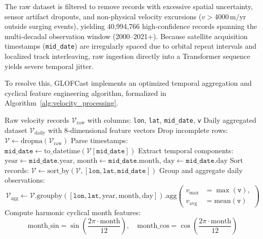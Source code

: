 \documentclass{mnnit}
\begin{document}
The raw dataset is filtered to remove records with excessive spatial uncertainty, sensor artifact dropouts, and non-physical velocity excursions ($v > 4000\,\text{m/yr}$ outside surging events), yielding 40,994,766 high-confidence records spanning the multi-decadal observation window (2000--2021+). Because satellite acquisition timestamps (\texttt{mid\_date}) are irregularly spaced due to orbital repeat intervals and localized track interleaving, raw ingestion directly into a Transformer sequence yields severe temporal jitter.

To resolve this, GLOFCast implements an optimized temporal aggregation and cyclical feature engineering algorithm, formalized in Algorithm~\ref{alg:velocity_processing}.

\begin{algorithm}[ht]
\caption{ITS\_LIVE Velocity Preprocessing and Daily Cyclical Harmonization}
\label{alg:velocity_processing}
\begin{algorithmic}[1]
\REQUIRE Raw velocity records $\mathcal{V}_{\text{raw}}$ with columns: \texttt{lon}, \texttt{lat}, \texttt{mid\_date}, \texttt{v}
\ENSURE Daily aggregated dataset $\mathcal{V}_{\text{daily}}$ with 8-dimensional feature vectors
\STATE Drop incomplete rows: $\mathcal{V} \leftarrow \text{dropna}(\mathcal{V}_{\text{raw}})$
\STATE Parse timestamps: $\texttt{mid\_date} \leftarrow \text{to\_datetime}(\mathcal{V}[\texttt{mid\_date}])$
\STATE Extract temporal components: $\text{year} \leftarrow \texttt{mid\_date}.\text{year}$, $\text{month} \leftarrow \texttt{mid\_date}.\text{month}$, $\text{day} \leftarrow \texttt{mid\_date}.\text{day}$
\STATE Sort records: $\mathcal{V} \leftarrow \text{sort\_by}(\mathcal{V}, [\texttt{lon}, \texttt{lat}, \texttt{mid\_date}])$
\STATE Group and aggregate daily observations:
\begin{equation*}
    \mathcal{V}_{\text{agg}} \leftarrow \mathcal{V}.\text{groupby}([\texttt{lon}, \texttt{lat}, \text{year}, \text{month}, \text{day}]).\text{agg}\left(
    \begin{aligned}
        v_{\max} &= \max(\texttt{v}), \\
        v_{\text{avg}} &= \text{mean}(\texttt{v})
    \end{aligned}
    \right)
\end{equation*}
\STATE Compute harmonic cyclical month features:
\begin{equation*}
    \text{month\_sin} = \sin\left(\frac{2\pi \cdot \text{month}}{12}\right), \quad \text{month\_cos} = \cos\left(\frac{2\pi \cdot \text{month}}{12}\right)

\end{equation*}
\end{algorithmic}
\end{algorithm}
\end{document}
